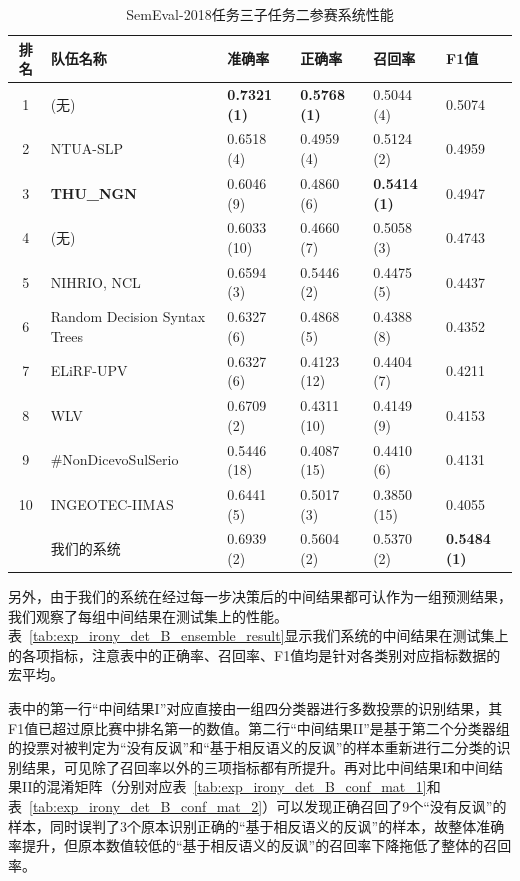 \begin{table}[htb]
  \centering
  \begin{minipage}[t]{\linewidth}
  \caption{SemEval-2018任务三子任务二参赛系统性能} %
  \label{tab:exp_irony_det_B_other_comp}
    \begin{tabularx}{\linewidth}{c|X|llll}
    \toprule[1.5pt]
    排名 & 队伍名称 & 准确率 & 正确率 & 召回率 & F1值 \\
    \hline 
    1 & (无) & \bf 0.7321 (1) & \bf 0.5768 (1) & 0.5044 (4) & 0.5074 \\
    2 & NTUA-SLP & 0.6518 (4) & 0.4959 (4) & 0.5124 (2) & 0.4959 \\
    3 & \bf THU\_NGN & 0.6046 (9) & 0.4860 (6) & \bf 0.5414 (1) & 0.4947 \\
    4 & (无) & 0.6033 (10) & 0.4660 (7) & 0.5058 (3) & 0.4743 \\
    5 & NIHRIO, NCL & 0.6594 (3) & 0.5446 (2) & 0.4475 (5) & 0.4437 \\
    6 & Random Decision Syntax Trees & 0.6327 (6) & 0.4868 (5) & 0.4388 (8) & 0.4352 \\
    7 & ELiRF-UPV & 0.6327 (6) & 0.4123 (12) & 0.4404 (7) & 0.4211 \\
    8 & WLV & 0.6709 (2) & 0.4311 (10) & 0.4149 (9) & 0.4153 \\
    9 & \#NonDicevoSulSerio & 0.5446 (18) & 0.4087 (15) & 0.4410 (6) & 0.4131 \\
    10 & INGEOTEC-IIMAS & 0.6441 (5) & 0.5017 (3) & 0.3850 (15) & 0.4055 \\
    \hline
    & 我们的系统 & 0.6939 (2) & 0.5604 (2) & 0.5370 (2) & \bf 0.5484 (1) \\
    \bottomrule[1.5pt]
    \end{tabularx}
  \end{minipage}
\end{table}

另外，由于我们的系统在经过每一步决策后的中间结果都可认作为一组预测结果，我们观察了每组中间结果在测试集上的性能。表~\ref{tab:exp_irony_det_B_ensemble_result}显示我们系统的中间结果在测试集上的各项指标，注意表中的正确率、召回率、F1值均是针对各类别对应指标数据的宏平均。

表中的第一行“中间结果I”对应直接由一组四分类器进行多数投票的识别结果，其F1值已超过原比赛中排名第一的数值。第二行“中间结果II”是基于第二个分类器组的投票对被判定为“没有反讽”和“基于相反语义的反讽”的样本重新进行二分类的识别结果，可见除了召回率以外的三项指标都有所提升。再对比中间结果I和中间结果II的混淆矩阵（分别对应表~\ref{tab:exp_irony_det_B_conf_mat_1}和表~\ref{tab:exp_irony_det_B_conf_mat_2}）可以发现正确召回了9个“没有反讽”的样本，同时误判了3个原本识别正确的“基于相反语义的反讽”的样本，故整体准确率提升，但原本数值较低的“基于相反语义的反讽”的召回率下降拖低了整体的召回率。

